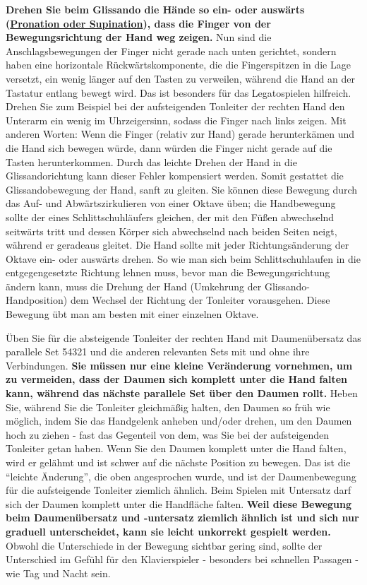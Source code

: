 \textbf{Drehen Sie beim Glissando die Hände so ein- oder auswärts (\hyperlink{c1iii4ProSup}{Pronation oder Supination}), dass die Finger von der Bewegungsrichtung der Hand weg zeigen.}
Nun sind die Anschlagsbewegungen der Finger nicht gerade nach unten gerichtet, sondern haben eine horizontale Rückwärtskomponente, die die Fingerspitzen in die Lage versetzt, ein wenig länger auf den Tasten zu verweilen, während die Hand an der Tastatur entlang bewegt wird.
Das ist besonders für das Legatospielen hilfreich.
Drehen Sie zum Beispiel bei der aufsteigenden Tonleiter der rechten Hand den Unterarm ein wenig im Uhrzeigersinn, sodass die Finger nach links zeigen.
Mit anderen Worten: Wenn die Finger (relativ zur Hand) gerade herunterkämen und die Hand sich bewegen würde, dann würden die Finger nicht gerade auf die Tasten herunterkommen.
Durch das leichte Drehen der Hand in die Glissandorichtung kann dieser Fehler kompensiert werden.
Somit gestattet die Glissandobewegung der Hand, sanft zu gleiten.
Sie können diese Bewegung durch das Auf- und Abwärtszirkulieren von einer Oktave üben; die Handbewegung sollte der eines Schlittschuhläufers gleichen, der mit den Füßen abwechselnd seitwärts tritt und dessen Körper sich abwechselnd nach beiden Seiten neigt, während er geradeaus gleitet.
Die Hand sollte mit jeder Richtungsänderung der Oktave ein- oder auswärts drehen.
So wie man sich beim Schlittschuhlaufen in die entgegengesetzte Richtung lehnen muss, bevor man die Bewegungsrichtung ändern kann, muss die Drehung der Hand (Umkehrung der Glissando-Handposition) dem Wechsel der Richtung der Tonleiter vorausgehen.
Diese Bewegung übt man am besten mit einer einzelnen Oktave.

Üben Sie für die absteigende Tonleiter der rechten Hand mit Daumenübersatz das parallele Set 54321 und die anderen relevanten Sets mit und ohne ihre Verbindungen.
\textbf{Sie müssen nur eine kleine Veränderung vornehmen, um zu vermeiden, dass der Daumen sich komplett unter die Hand falten kann, während das nächste parallele Set über den Daumen rollt.}
Heben Sie, während Sie die Tonleiter gleichmäßig halten, den Daumen so früh wie möglich, indem Sie das Handgelenk anheben und/oder drehen, um den Daumen hoch zu ziehen - fast das Gegenteil von dem, was Sie bei der aufsteigenden Tonleiter getan haben.
Wenn Sie den Daumen komplett unter die Hand falten, wird er gelähmt und ist schwer auf die nächste Position zu bewegen.
Das ist die \enquote{leichte Änderung}, die oben angesprochen wurde, und ist der Daumenbewegung für die aufsteigende Tonleiter ziemlich ähnlich.
Beim Spielen mit Untersatz darf sich der Daumen komplett unter die Handfläche falten.
\textbf{Weil diese Bewegung beim Daumenübersatz und -untersatz ziemlich ähnlich ist und sich nur graduell unterscheidet, kann sie leicht unkorrekt gespielt werden.}
Obwohl die Unterschiede in der Bewegung sichtbar gering sind, sollte der Unterschied im Gefühl für den Klavierspieler - besonders bei schnellen Passagen - wie Tag und Nacht sein.

